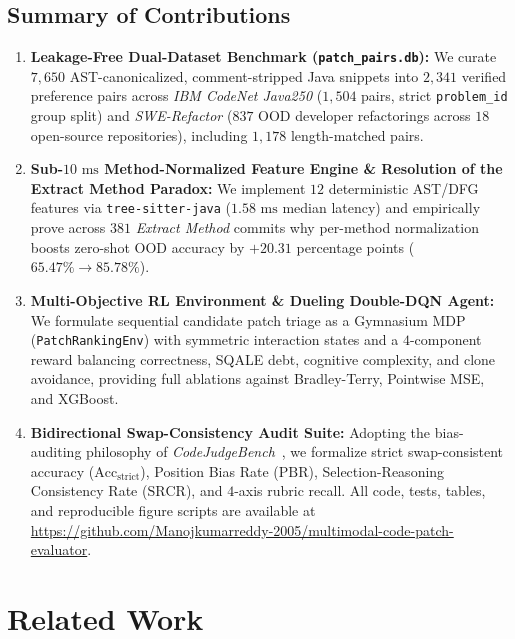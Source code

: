 \documentclass[conference]{IEEEtran}
\newcommand{\repoUrl}{\url{https://github.com/Manojkumarreddy-2005/multimodal-code-patch-evaluator}}
\begin{document}
\subsection{Summary of Contributions}
\begin{enumerate}
    \item \textbf{Leakage-Free Dual-Dataset Benchmark (\texttt{patch\_pairs.db}):} We curate $7{,}650$ AST-canonicalized, comment-stripped Java snippets into $2{,}341$ verified preference pairs across \textit{IBM CodeNet Java250} ($1{,}504$ pairs, strict \texttt{problem\_id} group split) and \textit{SWE-Refactor} ($837$ OOD developer refactorings across $18$ open-source repositories), including $1{,}178$ length-matched pairs.
    \item \textbf{Sub-$10\text{ ms}$ Method-Normalized Feature Engine \& Resolution of the Extract Method Paradox:} We implement $12$ deterministic AST/DFG features via \texttt{tree-sitter-java} ($1.58\text{ ms}$ median latency) and empirically prove across $381$ \textit{Extract Method} commits why per-method normalization boosts zero-shot OOD accuracy by $+20.31$ percentage points ($65.47\% \rightarrow 85.78\%$).
    \item \textbf{Multi-Objective RL Environment \& Dueling Double-DQN Agent:} We formulate sequential candidate patch triage as a Gymnasium MDP (\texttt{PatchRankingEnv}) with symmetric interaction states and a $4$-component reward balancing correctness, SQALE debt, cognitive complexity, and clone avoidance, providing full ablations against Bradley-Terry, Pointwise MSE, and XGBoost.
    \item \textbf{Bidirectional Swap-Consistency Audit Suite:} Adopting the bias-auditing philosophy of \textit{CodeJudgeBench}~\cite{codejudgebench2025}, we formalize strict swap-consistent accuracy ($\text{Acc}_{\text{strict}}$), Position Bias Rate ($\text{PBR}$), Selection-Reasoning Consistency Rate ($\text{SRCR}$), and $4$-axis rubric recall. All code, tests, tables, and reproducible figure scripts are available at \repoUrl.
\end{enumerate}

\section{Related Work}
\label{sec:related}
\end{document}
